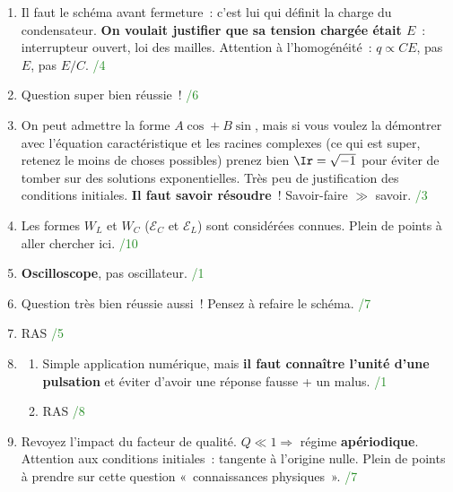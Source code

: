 \documentclass[a4paper, 10pt, final, garamond]{book}
\begin{document}
\begin{enumerate}
    \item Il faut le schéma avant fermeture~: c'est lui qui définit la charge du
        condensateur. \textbf{On voulait justifier que sa tension chargée était
        $E$}~: interrupteur ouvert, loi des mailles. Attention à l'homogénéité~:
        $q \propto CE$, pas $E$, pas $E/C$.
        \hfill \textcolor{ForestGreen}{/4}

    \item Question super bien réussie~!
        \hfill \textcolor{ForestGreen}{/6}

    \item On peut admettre la forme $A\cos + B\sin$, mais si vous voulez la
        démontrer avec l'équation caractéristique et les racines complexes
        (ce qui est super, retenez le moins de choses possibles) prenez bien
        $\Ir = \sqrt{-1}$ pour éviter de tomber sur des solutions
        exponentielles. Très peu de justification des conditions initiales.
        \textbf{Il faut savoir résoudre}~! Savoir-faire $\gg$ savoir.
        \hfill \textcolor{ForestGreen}{/3}

    \item Les formes $W_L$ et $W_C$ ($\mathcal{E}_C$ et $\mathcal{E}_L$) sont
        considérées connues. Plein de points à aller chercher ici.
        \hfill \textcolor{ForestGreen}{/10}

    \item \textbf{Oscilloscope}, pas oscillateur.
        \hfill \textcolor{ForestGreen}{/1}

    \item Question très bien réussie aussi~! Pensez à refaire le schéma.
        \hfill \textcolor{ForestGreen}{/7}

    \item RAS
        \hfill \textcolor{ForestGreen}{/5}

    \item 
        \begin{enumerate}
            \item Simple application numérique, mais \textbf{il faut connaître
                l'unité d'une pulsation} et éviter d'avoir une réponse fausse +
                un malus.
                \hfill \textcolor{ForestGreen}{/1}
            \item RAS
                \hfill \textcolor{ForestGreen}{/8}
        \end{enumerate}
    \item Revoyez l'impact du facteur de qualité. $Q \ll 1 \Rightarrow$ régime
        \textbf{apériodique}. Attention aux conditions initiales~: tangente à
        l'origine nulle. Plein de points à prendre sur cette question
        «~connaissances physiques~».
        \hfill \textcolor{ForestGreen}{/7}
\end{enumerate}
\end{document}
